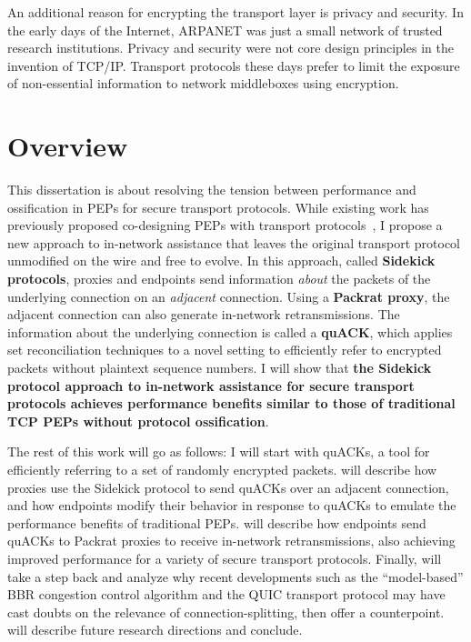 An additional reason for encrypting the transport layer is privacy and security.
In the early days of the Internet, ARPANET was just a small network of trusted
research institutions. Privacy and security were not core design principles in
the invention of TCP/IP. Transport protocols these days prefer to limit the
exposure of non-essential information to network middleboxes using encryption.

\section{Overview}

This dissertation is about resolving the tension between performance and
ossification in PEPs for secure transport protocols. While existing work has
previously proposed co-designing PEPs with transport protocols~\cite{ford2008logjam,sherry2015blindbox, dogar2012tapa,iyengar2009flow},
I propose a new
approach to in-network assistance that leaves the original transport protocol
unmodified on the wire and free to evolve. In this approach, called \textbf
{Sidekick protocols}, proxies and endpoints send information \textit{about} the
packets of the underlying connection on an \textit{adjacent} connection.
Using a \textbf{Packrat proxy}, the adjacent connection can also generate
in-network retransmissions.
The information about the underlying connection is called a \textbf
{quACK}, which applies set reconciliation techniques to a novel setting to
efficiently refer to encrypted packets without plaintext sequence numbers.
I will show that \textcolor{black!50!blue}{\textbf{the Sidekick protocol
approach to in-network assistance for secure transport protocols achieves
performance benefits similar to those of traditional TCP PEPs without protocol
ossification}}.

The rest of this work will go as follows:
I will start  with quACKs, a tool for efficiently
referring to a set of randomly encrypted packets.
 will describe how proxies use the Sidekick protocol to send
quACKs over an adjacent connection, and how endpoints modify their behavior in
response to quACKs to emulate the performance benefits of traditional PEPs.
 will describe how endpoints send quACKs to Packrat
proxies to receive in-network retransmissions, also achieving improved
performance for a variety of secure transport protocols.
Finally,  will take a step back and analyze why recent
developments such as the ``model-based'' BBR congestion control algorithm and
the QUIC transport protocol may have cast doubts on the relevance of
connection-splitting, then offer a counterpoint.
 will describe future research directions and conclude.

